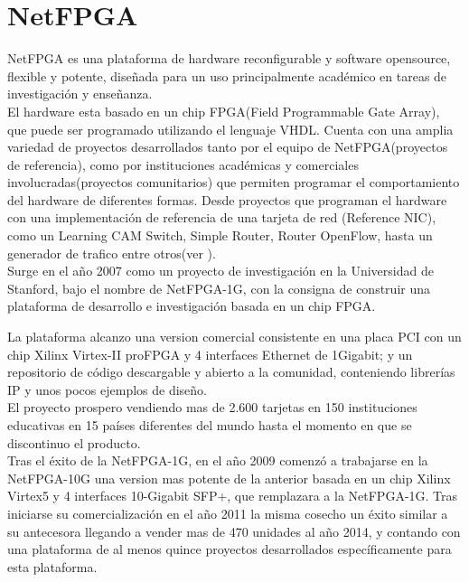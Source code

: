 \section{NetFPGA}
\label{section2.9}

NetFPGA\cite{NetFPGA1} es una plataforma de hardware reconfigurable y software opensource, flexible y potente, diseñada para un uso principalmente académico en tareas de investigación y enseñanza.\\

El hardware esta basado en un chip FPGA(Field Programmable Gate Array), que puede ser programado  utilizando el lenguaje VHDL. Cuenta con una amplia variedad de proyectos desarrollados tanto por el equipo de NetFPGA(proyectos de referencia), como por instituciones académicas y comerciales involucradas(proyectos comunitarios) que permiten programar el comportamiento del hardware  de diferentes formas. Desde proyectos que programan el hardware con una implementación de referencia de una tarjeta de red (Reference NIC), como un Learning CAM Switch, Simple Router, Router OpenFlow, hasta un generador de trafico entre otros(ver \citep{NetFPGA2}).\\ 

Surge en el año 2007 como un proyecto de investigación en la Universidad de Stanford, bajo el nombre de NetFPGA-1G, con la consigna de construir una plataforma de desarrollo e investigación basada en un chip FPGA.
 
La plataforma alcanzo una version comercial consistente en una placa PCI con un chip Xilinx Virtex-II proFPGA y 4 interfaces Ethernet de 1Gigabit; y un repositorio de código descargable y abierto a la comunidad, conteniendo librerías IP y unos pocos ejemplos de diseño.\\

El proyecto prospero vendiendo mas de 2.600 tarjetas en 150 instituciones educativas en 15 países diferentes del mundo hasta el momento en que se discontinuo el producto.\\

Tras el éxito de la NetFPGA-1G, en el año 2009 comenzó a trabajarse en la NetFPGA-10G una version mas potente de la  anterior basada en un chip Xilinx Virtex5 y 4 interfaces 10-Gigabit SFP+, que remplazara a la NetFPGA-1G. Tras iniciarse su comercialización en el año 2011 la misma cosecho un éxito similar a su antecesora llegando a vender mas de 470 unidades al año 2014, y contando con una plataforma de al menos quince proyectos desarrollados específicamente para esta plataforma.\\

